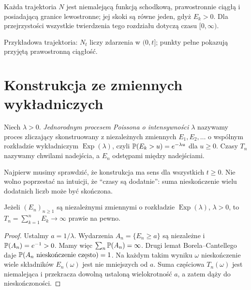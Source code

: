 Każda trajektoria $N$ jest niemalejącą funkcją schodkową, prawostronnie
ciągłą i posiadającą granice lewostronne; jej skoki są równe jeden,
gdyż $E_k>0$. Dla przejrzystości wszystkie twierdzenia tego rozdziału
dotyczą czasu $[0,\infty)$.

\begin{center}
\par\smallskip\small Przykładowa trajektoria: $N_t$ liczy zdarzenia w $(0,t]$;
punkty pełne pokazują przyjętą prawostronną ciągłość.
\end{center}

\section{Konstrukcja ze zmiennych wykładniczych}
\begin{definicja}
Niech $\lambda>0$. \emph{Jednorodnym procesem Poissona o intensywności
$\lambda$} nazywamy proces zliczający skonstruowany z niezależnych
zmiennych $E_1,E_2,\ldots$ o wspólnym rozkładzie wykładniczym
$\operatorname{Exp}(\lambda)$, czyli
$\mathbb{P}(E_k>u)=e^{-\lambda u}$ dla $u\ge0$.
Czasy $T_n$ nazywamy chwilami nadejścia, a $E_n$ odstępami między
nadejściami.
\end{definicja}

Najpierw musimy sprawdzić, że konstrukcja ma sens dla wszystkich
$t\ge0$. Nie wolno poprzestać na intuicji, że ``czasy są dodatnie'':
suma nieskończenie wielu dodatnich liczb może być skończona.

\begin{lemat}
Jeżeli $(E_n)_{n\ge1}$ są niezależnymi zmiennymi o rozkładzie
$\operatorname{Exp}(\lambda)$, $\lambda>0$, to
$T_n=\sum_{k=1}^n E_k\to\infty$ prawie na pewno.
\end{lemat}
\begin{proof}
Ustalmy $a=1/\lambda$. Wydarzenia $A_n=\{E_n\ge a\}$ są niezależne
i $\mathbb{P}(A_n)=e^{-1}>0$. Mamy więc
$\sum_n\mathbb{P}(A_n)=\infty$. Drugi lemat Borela--Cantellego daje
$\Prob(A_n\ \text{nieskończenie często})=1$. Na każdym takim
wyniku $\omega$ nieskończenie wiele składników $E_n(\omega)$ jest
nie mniejszych od $a$. Suma częściowa $T_n(\omega)$ jest niemalejąca
i przekracza dowolną ustaloną wielokrotność $a$, a zatem dąży do
nieskończoności.
\end{proof}

